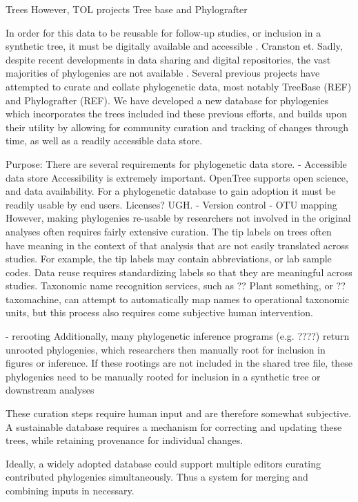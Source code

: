 \documentclass[a4paper,10pt]{article}
\begin{document}
Trees 
     However,
     TOL projects
     Tree base and Phylografter

In order for this data to be reusable for follow-up studies, or inclusion in a synthetic tree, it must be digitally available and accessible \cite{cranston_best_2014}.
Cranston et. \cite{}
Sadly, despite recent developments in data sharing and digital repositories, the vast majorities of phylogenies are not available \cite{Drew}.
Several previous projects have attempted to curate and collate phylogenetic data, most notably TreeBase (REF) and Phylografter (REF).
We have developed a new database for phylogenies which incorporates the trees included ind these previous efforts, 
and builds upon their utility by allowing for community curation and tracking of changes through time, as well as a readily accessible data store.

  Purpose:
There are several requirements for phylogenetic data store.
      - Accessible data store
Accessibility is extremely important.
OpenTree supports open science, and data availability.
For a phylogenetic database to gain adoption it must be readily usable by end users.
Licenses? UGH.
          - Version control
          - OTU mapping
However, making phylogenies re-usable by researchers not involved in the original analyses often requires fairly extensive curation.
The tip labels on trees often have meaning in the context of that analysis that are not easily translated across studies. 
For example, the tip labels may contain abbreviations, or lab sample codes.
Data reuse requires standardizing labels so that they are meaningful across studies.
Taxonomic name recognition services, such as ?? Plant something, or ?? taxomachine, can attempt to automatically map names to
operational taxonomic units, but this process also requires come subjective human intervention. 

          - rerooting
Additionally, many phylogenetic inference programs (e.g. ????) return unrooted phylogenies, 
which researchers then manually root for inclusion in figures or inference. 
If these rootings are not included in the shared tree file, 
these phylogenies need to be manually rooted for inclusion in a synthetic tree or downstream analyses

These curation steps require human input and are therefore somewhat subjective.
A sustainable database requires a mechanism for correcting and updating these trees,
while retaining provenance for individual changes.

Ideally, a widely adopted database could support multiple editors curating contributed phylogenies simultaneously.
Thus a system for merging and combining inputs in necessary.
\end{document}
